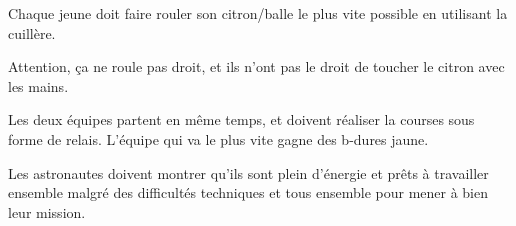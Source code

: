 \documentclass{grand-jeu}
\begin{document}
\begin{liste-materiel}
\end{liste-materiel}

\begin{regles}
Chaque jeune doit faire rouler son citron/balle le plus vite possible en utilisant la cuillère. 

Attention, ça ne roule pas droit, et ils n'ont pas le droit de toucher le citron avec les mains.

Les deux équipes partent en même temps, et doivent réaliser la courses sous forme de relais. L’équipe qui va le plus vite gagne des b-dures jaune. 
\end{regles}

\begin{imaginaire}
Les astronautes doivent montrer qu'ils sont plein d'énergie et prêts à travailler ensemble malgré des difficultés techniques et tous ensemble pour mener à bien leur mission.  
\end{imaginaire}

\begin{moments-stop}
\end{moments-stop}
\end{document}
